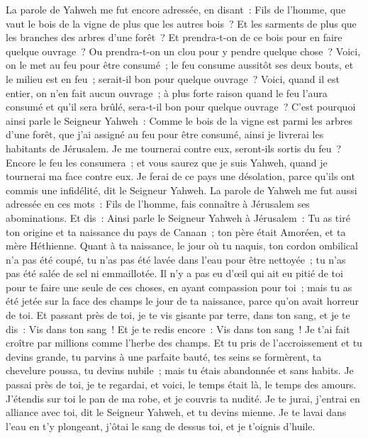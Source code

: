 \begin{multicols}{2}
\VerseOne{}La parole de Yahweh me fut encore adressée, en disant~:
Fils de l'homme, que vaut le bois de la vigne de plus que les autres bois~? Et les sarments de plus que les branches des arbres d'une forêt~?
Et prendra-t-on de ce bois pour en faire quelque ouvrage~? Ou prendra-t-on un clou pour y pendre quelque chose~?
Voici, on le met au feu pour être consumé~; le feu consume aussitôt ses deux bouts, et le milieu est en feu~; serait-il bon pour quelque ouvrage~?
Voici, quand il est entier, on n'en fait aucun ouvrage~; à plus forte raison quand le feu l'aura consumé et qu'il sera brûlé, sera-t-il bon pour quelque ouvrage~?
C'est pourquoi ainsi parle le Seigneur Yahweh~: Comme le bois de la vigne est parmi les arbres d'une forêt, que j'ai assigné au feu pour être consumé, ainsi je livrerai les habitants de Jérusalem.
Je me tournerai contre eux, seront-ils sortis du feu~? Encore le feu les consumera~; et vous saurez que je suis Yahweh, quand je tournerai ma face contre eux.
Je ferai de ce pays une désolation, parce qu'ils ont commis une infidélité, dit le Seigneur Yahweh.
\VerseOne{}La parole de Yahweh me fut aussi adressée en ces mots~:
Fils de l'homme, fais connaître à Jérusalem ses abominations.
Et dis~: Ainsi parle le Seigneur Yahweh à Jérusalem~: Tu as tiré ton origine et ta naissance du pays de Canaan~; ton père était Amoréen, et ta mère Héthienne.
Quant à ta naissance, le jour où tu naquis, ton cordon ombilical n'a pas été coupé, tu n'as pas été lavée dans l'eau pour être nettoyée~; tu n'as pas été salée de sel ni emmaillotée.
Il n'y a pas eu d'œil qui ait eu pitié de toi pour te faire une seule de ces choses, en ayant compassion pour toi~; mais tu as été jetée sur la face des champs le jour de ta naissance, parce qu'on avait horreur de toi.
Et passant près de toi, je te vis gisante par terre, dans ton sang, et je te dis~: Vis dans ton sang~! Et je te redis encore~: Vis dans ton sang~!
Je t'ai fait croître par millions comme l'herbe des champs. Et tu pris de l'accroissement et tu devins grande, tu parvins à une parfaite bauté, tes seins se formèrent, ta chevelure poussa, tu devins nubile~; mais tu étais abandonnée et sans habits.
Je passai près de toi, je te regardai, et voici, le temps était là, le temps des amours. J'étendis sur toi le pan de ma robe, et je couvris ta nudité. Je te jurai, j'entrai en alliance avec toi, dit le Seigneur Yahweh, et tu devins mienne.
Je te lavai dans l'eau en t'y plongeant, j'ôtai le sang de dessus toi, et je t'oignis d'huile.

\end{multicols}
